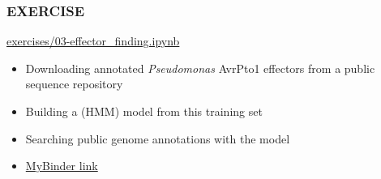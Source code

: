 \begin{frame}
  \frametitle{EXERCISE}
  \begin{alertblock}{\url{exercises/03-effector_finding.ipynb}}
    \begin{itemize}
      \item Downloading annotated \textit{Pseudomonas} AvrPto1 effectors from a public sequence repository
      \item Building a (HMM) model from this training set
      \item Searching public genome annotations with the model
    \end{itemize}
  \end{alertblock}
  \begin{itemize}
    \item \textcolor{hutton_purple}{\href{http://mybinder.org/repo/widdowquinn/Teaching-EMBL-Plant-Path-Genomics}{MyBinder link}}
  \end{itemize}
\end{frame}

